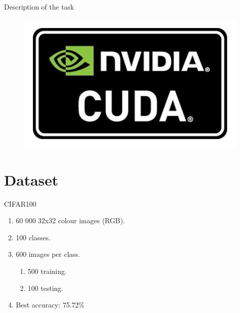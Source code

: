 \documentclass{beamer}
\begin{document}
\begin{frame}[fragile]{Description of the task}
\begin{figure}[H]
  \includegraphics[scale=0.1]{img/cuda.jpg}
 \end{figure}

\end{frame}

\section{Dataset}
\begin{frame}[fragile]{CIFAR100}
 \begin{enumerate}
  \item<+-> 60 000 32x32 colour images (RGB).
  \item<+-> 100 classes.
  \item<+-> 600 images per class.
        \begin{enumerate}
         \item<+-> 500 training.
         \item<+-> 100 testing.
        \end{enumerate}
  \item<+-> Best accuracy: 75.72\%
 \end{enumerate}

\end{frame}
\end{document}

